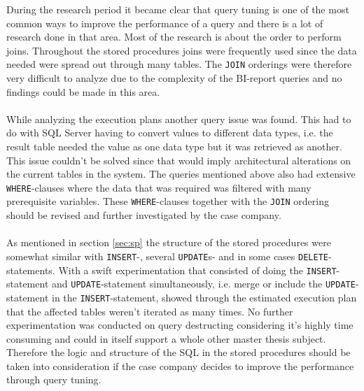 \documentclass{cslthse-msc}
\begin{document}
During the research period it became clear that query tuning is one of the most common ways to improve the performance of a query and there is a lot of research done in that area. Most of the research is about the order to perform joins. Throughout the stored procedures joins were frequently used since the data needed were spread out through many tables. The \texttt{JOIN} orderings were therefore very difficult to analyze due to the complexity of the BI-report queries and no findings could be made in this area.\\\\ While analyzing the execution plans another query issue was found. This had to do with SQL Server having to convert values to different data types, i.e. the result table needed the value as one data type but it was retrieved as another. This issue couldn't be solved since that would imply architectural alterations on the current tables in the system. The queries mentioned above also had extensive \texttt{WHERE}-clauses where the data that was required was filtered with many prerequisite variables. These \texttt{WHERE}-clauses together with the \texttt{JOIN} ordering should be revised and further investigated by the case company.\\\\ As mentioned in section \ref{sec:sp} the structure of the stored procedures were somewhat similar with \texttt{INSERT}-, several \texttt{UPDATE}s- and in some cases \texttt{DELETE}-statements. With a swift experimentation that consisted of doing the \texttt{INSERT}-statement and \texttt{UPDATE}-statement simultaneously, i.e. merge or include the \texttt{UPDATE}-statement in the \texttt{INSERT}-statement, showed through the estimated execution plan that the affected tables weren't iterated as many times. No further experimentation was conducted on query destructing considering it's highly time consuming and could in itself support a whole other master thesis subject. Therefore the logic and structure of the SQL in the stored procedures should be taken into consideration if the case company decides to improve the performance through query tuning.        
\end{document}
